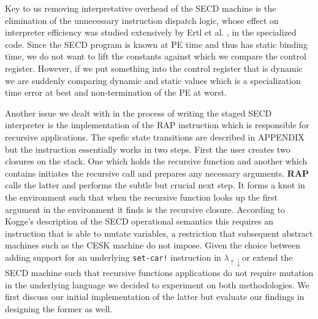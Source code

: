 \documentclass{article}
\theoremstyle{definition}
\newcommand{\mslang}{$\lambda_{\uparrow\downarrow}$}
\begin{document}
Key to us removing interpretative overhead of the SECD machine is the elimination of the unnecessary instruction dispatch logic, whose effect on interpreter efficiency was studied extensively by Ertl et al. \cite{ertl2003structure}, in the specialized code. Since the SECD program is known at PE time and thus has static binding time, we do not want to lift the constants against which we compare the control register. However, if we put something into the control register that is dynamic we are suddenly comparing dynamic and static values which is a specialization time error at best and non-termination of the PE at worst.

Another issue we dealt with in the process of writing the staged SECD interpreter is the implementation of the RAP instruction which is responsible for recursive applications. The spefic state transitions are described in APPENDIX but the instruction essentially works in two steps. First the user creates two closures on the stack. One which holds the recursive function and another which contains initiates the recursive call and prepares any necessary arguments. \textbf{RAP} calls the latter and performs the subtle but crucial next step. It forms a knot in the environment such that when the recursive function looks up the first argument in the environment it finds is the recursive closure. According to Kogge's \cite{kogge1990architecture} description of the SECD operational semantics this requires an instruction that is able to mutate variables, a restriction that subsequent abstract machines such as the CESK machine \cite{felleisen1987calculi} do not impose. Given the choice between adding support for an underlying \texttt{set-car!} instruction in \mslang or extend the SECD machine such that recursive functions applications do not require mutation in the underlying language we decided to experiment on both methodologies. We first discuss our initial implementation of the latter but evaluate our findings in designing the former as well.


\end{document}
